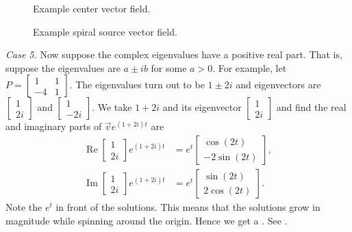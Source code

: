 \documentclass[12pt]{book}
\begin{document}
\begin{figure}[h!t]
\begin{center}
\parbox[t]{3.1in}{
 \capstart
 \caption{Example center vector field.\label{pln:ellipsesfig}}
}
\quad
\parbox[t]{3.1in}{
 \capstart
 \caption{Example spiral source vector field.\label{pln:spiral-sourcefig}}
}
\end{center}
\end{figure}

\medskip

\emph{Case 5.} Now suppose the complex eigenvalues have a positive real
part.  That is, suppose the eigenvalues are $a \pm ib$ for some $a > 0$.
For example, let $P = 
\left[ \begin{smallmatrix} 1 & 1 \\ -4 & 1 \end{smallmatrix} \right]$.
The eigenvalues turn out to be $1\pm 2i$ and eigenvectors are
$\left[ \begin{smallmatrix} 1 \\ 2i \end{smallmatrix} \right]$ and
$\left[ \begin{smallmatrix} 1 \\ -2i \end{smallmatrix} \right]$.  We take
$1 + 2i$ and its eigenvector
$\left[ \begin{smallmatrix} 1 \\ 2i \end{smallmatrix} \right]$ and find
the real and imaginary parts of
$\vec{v} e^{(1+2i)t}$ are
\begin{align*}
\operatorname{Re}
\begin{bmatrix} 1 \\ 2i \end{bmatrix} e^{(1+2i)t} & =
e^t
\begin{bmatrix} \cos (2t) \\ -2 \sin (2t)  \end{bmatrix} ,
\\
\operatorname{Im}
\begin{bmatrix} 1 \\ 2i \end{bmatrix} e^{(1+2i)t} & =
e^t
\begin{bmatrix} \sin (2t) \\ 2 \cos (2t) \end{bmatrix} .
\end{align*}
Note the $e^t$ in front of the solutions.  This means that the solutions
grow in magnitude while spinning around the origin.  Hence we get
a \emph{}.
See .
\end{document}
